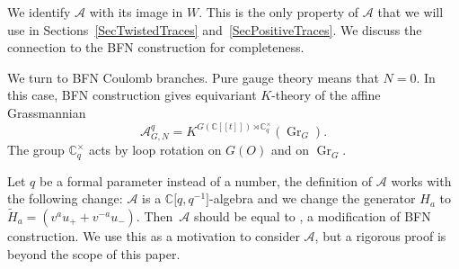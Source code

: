 \documentclass[pdftex]{sigma}
\newcommand\CC{\mathbb{C}}
\DeclareMathOperator\SL{SL}
\newcommand{\mc}{\mathcal}
\newcommand{\Gr}{\operatorname{Gr}}
\newcommand{\PGL}{\operatorname{PGL}}
\numberwithin{equation}{section}
\theoremstyle{definition}
\begin{document}
We identify $\mc{A}$ with its image in $W$. This is the only property of $\mc{A}$ that we will use in Sections~\ref{SecTwistedTraces} and~\ref{SecPositiveTraces}. We discuss the connection to the BFN construction for completeness.

We turn to BFN Coulomb branches. Pure gauge theory means that $N=0$. In this case, BFN construction gives equivariant $K$-theory of the affine Grassmannian \[\mc{A}^q_{G,N}=K^{G(\CC[[t]])\rtimes \CC_q^{\times}}(\Gr_G).\] The group $\CC_q^{\times}$ acts by loop rotation on $G(O)$ and on $\Gr_G$.


Let $q$ be a formal parameter instead of a number, the definition of $\mc{A}$ works with the following change: $\mc{A}$ is a $\CC\big[q,q^{-1}\big]$-algebra and we change the generator $H_a$ to $\tilde{H}_a=(v^au_++v^{-a}u_-)$. Then~$\mc{A}$ should be equal to \smash{$K^{\SL(2,\CC[[t]])\rtimes \CC_q^{\times}}(\Gr_{\PGL_2})$}, a modification of BFN construction. We use this as a motivation to consider $\mc{A}$, but a rigorous proof is beyond the scope of this paper.
\end{document}
